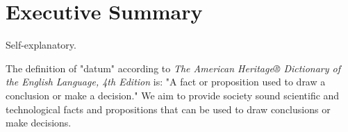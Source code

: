 \section{Executive Summary}
Self-explanatory.

The definition of "datum" according to \emph{The American Heritage® Dictionary of the English Language, 4th Edition} is: "A fact or proposition used to draw a conclusion or make a decision." We aim to provide society sound scientific and technological facts and propositions that can be used to draw conclusions or make decisions.